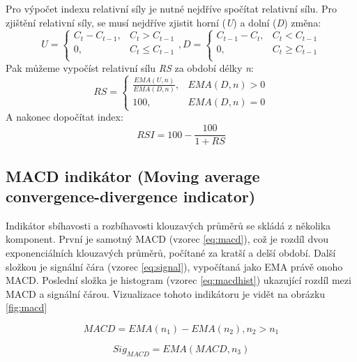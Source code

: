 Pro výpočet indexu relativní síly je nutné nejdříve spočítat relativní sílu. Pro zjištění relativní síly, se musí nejdříve zjistit horní (\emph{U}) a dolní (\emph{D}) změna:
\begin{equation}
    U = \begin{cases}
        C_t - C_{t - 1}, & C_t > C_{t - 1}   \\
        0,               & C_t \le C_{t - 1} \\
    \end{cases}
    ,
    D = \begin{cases}
        C_{t - 1} - C_t, & C_t < C_{t - 1}   \\
        0,               & C_t \ge C_{t - 1} \\
    \end{cases}
    \label{eq:du}
\end{equation}
Pak můžeme vypočíst relativní sílu \emph{RS} za období délky \emph{n}:
\begin{equation}
    RS =
    \begin{cases}
        \frac{EMA(U, n)}{EMA(D, n)}, & {EMA(D, n)} > 0 \\
        100,                         & {EMA(D, n)} = 0
    \end{cases}
    \label{eq:rs}
\end{equation}
A nakonec dopočítat index:
\begin{equation}
    RSI = 100 - \frac{100}{1 + RS}
    \label{eq:rsi}
\end{equation}

\subsection{MACD indikátor (Moving average convergence-divergence indicator)}
Indikátor sbíhavosti a rozbíhavosti klouzavých průměrů se skládá z několika komponent. První je samotný MACD (vzorec \ref{eq:macd}), což je rozdíl dvou exponenciálních klouzavých průměrů, počítané
za kratší a delší období. Další složkou je signální čára (vzorec \ref{eq:signal}), vypočítaná jako EMA právě onoho MACD. Poslední složka je histogram (vzorec \ref{eq:macdhist})
ukazující rozdíl mezi MACD a signální čárou. Vizualizace tohoto indikátoru je vidět na obrázku \ref{fig:macd}

\begin{equation}
    MACD = EMA(n_1) - EMA(n_2), n_2 > n_1
    \label{eq:macd}
\end{equation}

\begin{equation}
    Sig_{MACD} = EMA(MACD, n_3)
    \label{eq:signal}
\end{equation}

